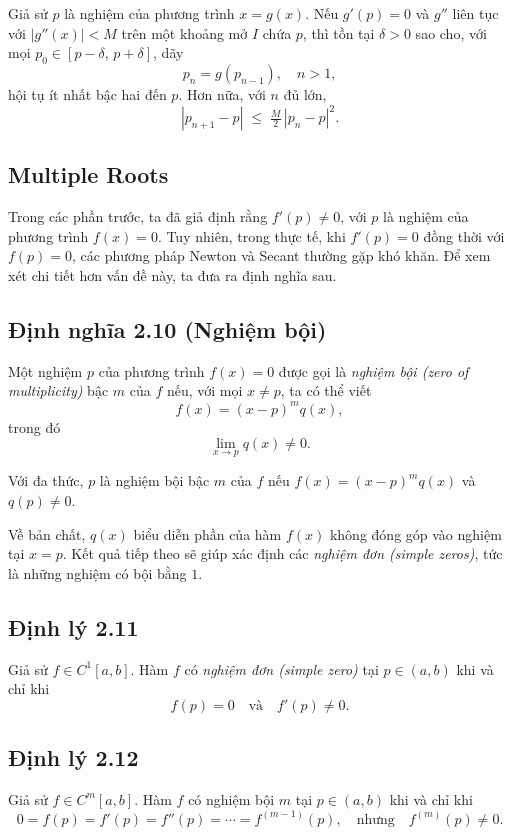 Giả sử $p$ là nghiệm của phương trình $x = g(x)$. 
Nếu $g'(p) = 0$ và $g''$ liên tục với $|g''(x)| < M$ trên một khoảng mở $I$ chứa $p$, 
thì tồn tại $\delta > 0$ sao cho, với mọi $p_0 \in [p-\delta,\, p+\delta]$, 
dãy
\[
p_n = g(p_{n-1}), \quad n > 1,
\]
hội tụ ít nhất bậc hai đến $p$. Hơn nữa, với $n$ đủ lớn,
\[
|p_{n+1} - p| \;\leq\; \tfrac{M}{2}\,|p_n - p|^2.
\]


\subsection*{\textbf{Multiple Roots}}

Trong các phần trước, ta đã giả định rằng $f'(p) \neq 0$, 
với $p$ là nghiệm của phương trình $f(x) = 0$. 
Tuy nhiên, trong thực tế, khi $f'(p) = 0$ đồng thời với $f(p) = 0$, 
các phương pháp Newton và Secant thường gặp khó khăn. 
Để xem xét chi tiết hơn vấn đề này, ta đưa ra định nghĩa sau.

\subsection*{\textbf{Định nghĩa 2.10 (Nghiệm bội)}}

Một nghiệm $p$ của phương trình $f(x) = 0$ được gọi là 
\textit{nghiệm bội (zero of multiplicity)} bậc $m$ của $f$ 
nếu, với mọi $x \neq p$, ta có thể viết
\[
f(x) = (x - p)^m q(x),
\]
trong đó 
\[
\lim_{x \to p} q(x) \neq 0.
\]

Với đa thức, $p$ là nghiệm bội bậc $m$ của $f$ 
nếu $f(x) = (x - p)^m q(x)$ và $q(p) \neq 0$.

Về bản chất, $q(x)$ biểu diễn phần của hàm $f(x)$ 
không đóng góp vào nghiệm tại $x = p$. 
Kết quả tiếp theo sẽ giúp xác định các \textit{nghiệm đơn (simple zeros)}, 
tức là những nghiệm có bội bằng $1$.

\subsection*{\textbf{Định lý 2.11}}

Giả sử $f \in C^1[a,b]$. 
Hàm $f$ có \textit{nghiệm đơn (simple zero)} tại $p \in (a,b)$ 
khi và chỉ khi 
\[
f(p) = 0 \quad \text{và} \quad f'(p) \neq 0.
\]

\subsection*{\textbf{Định lý 2.12}}

Giả sử $f \in C^m[a,b]$.  
Hàm $f$ có nghiệm bội $m$ tại $p \in (a,b)$ 
khi và chỉ khi
\[
0 = f(p) = f'(p) = f''(p) = \cdots = f^{(m-1)}(p), 
\quad \text{nhưng} \quad f^{(m)}(p) \neq 0.
\]

